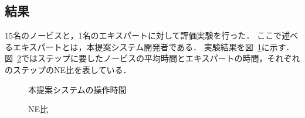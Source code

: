 \documentclass[sotsuron]{kuee}
\begin{document}
		\subsection{結果}
			15名のノービスと，1名のエキスパートに対して評価実験を行った．
			ここで述べるエキスパートとは，本提案システム開発者である．
			実験結果を図~\ref{fig:result01}に示す．
			図~\ref{fig:result02}ではステップに要したノービスの平均時間とエキスパートの時間，それぞれのステップのNE比を表している．
			\begin{figure}
				\begin{center}
				\end{center}
				\caption{本提案システムの操作時間}
		  		\label{fig:result01}
			\end{figure}
			\begin{figure}
				\begin{center}
				\end{center}
				\caption{NE比}
		  		\label{fig:result02}
			\end{figure}
\end{document}
